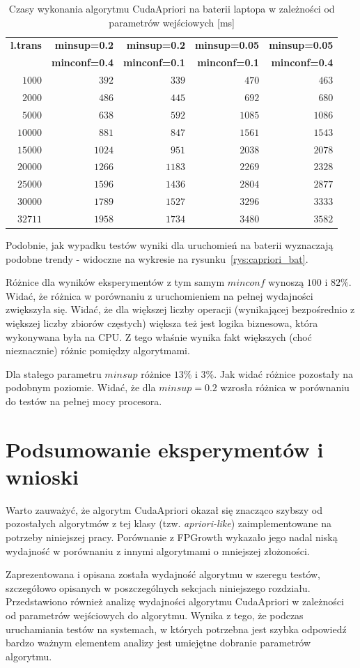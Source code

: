 \begin{table}
	\centering
	\begin{tabular}{r|r|r|r|r}
	\textbf{l.trans} & \textbf{minsup=0.2} & \textbf{minsup=0.2} & \textbf{minsup=0.05} & \textbf{minsup=0.05}  \\
	 & \textbf{minconf=0.4} & \textbf{minconf=0.1} & \textbf{minconf=0.1} & \textbf{minconf=0.4}  \\ \hline
	$1000$ & $392$ & $339$ & $470$ & $463$ \\
	$2000$ & $486$ & $445$ & $692$ & $680$ \\
	$5000$ & $638$ & $592$ & $1085$ & $1086$ \\
	$10000$ & $881$ & $847$ & $1561$ & $1543$ \\
	$15000$ & $1024$ & $951$ & $2038$ & $2078$ \\
	$20000$ & $1266$ & $1183$ & $2269$ & $2328$ \\
	$25000$ & $1596$ & $1436$ & $2804$ & $2877$ \\
	$30000$ & $1789$ & $1527$ & $3296$ & $3333$ \\
	$32711$ & $1958$ & $1734$ & $3480$ & $3582$ \\
	\end{tabular}
	\caption{Czasy wykonania algorytmu CudaApriori na baterii laptopa w zależności od parametrów wejściowych [ms]\label{tab:capriori_bat}}
\end{table}

Podobnie, jak wypadku testów wyniki dla uruchomień na baterii wyznaczają podobne trendy - widoczne na wykresie na rysunku~\ref{rys:capriori_bat}.

Różnice dla wyników eksperymentów z tym samym $minconf$ wynoszą $100$ i $82\%$. Widać, że różnica w porównaniu z uruchomieniem na pełnej wydajności zwiększyła się. Widać, że dla większej liczby operacji (wynikającej bezpośrednio z większej liczby zbiorów częstych) większa też jest logika biznesowa, która wykonywana była na CPU. Z tego właśnie wynika fakt większych (choć nieznacznie) różnic pomiędzy algorytmami. 

Dla stałego parametru $minsup$ różnice $13\%$ i $3\%$. Jak widać różnice pozostały na podobnym poziomie. Widać, że dla $minsup=0.2$ wzrosła różnica w porównaniu do testów na pełnej mocy procesora.

\section{Podsumowanie eksperymentów i wnioski}

Warto zauważyć, że algorytm CudaApriori okazał się znacząco szybszy od pozostałych algorytmów z tej klasy (tzw. \emph{apriori-like}) zaimplementowane na potrzeby niniejszej pracy. Porównanie z FPGrowth wykazało jego nadal niską wydajność w porównaniu z innymi algorytmami o mniejszej złożoności. 

Zaprezentowana i opisana została wydajność algorytmu w szeregu testów, szczegółowo opisanych w poszczególnych sekcjach niniejszego rozdziału. Przedstawiono również analizę wydajności algorytmu CudaApriori w zależności od parametrów wejściowych do algorytmu. Wynika z tego, że podczas uruchamiania testów na systemach, w których potrzebna jest szybka odpowiedź bardzo ważnym elementem analizy jest umiejętne dobranie parametrów algorytmu.
